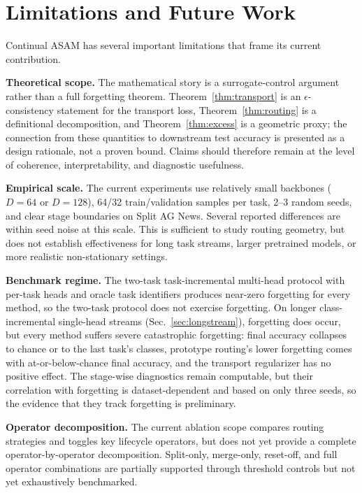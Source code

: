 \documentclass[11pt,a4paper]{article}
\theoremstyle{definition}
\begin{document}
\section{Limitations and Future Work}
\label{sec:limitations}

Continual ASAM has several important limitations that frame its current contribution.

\textbf{Theoretical scope.} The mathematical story is a surrogate-control argument rather than a full forgetting theorem. Theorem~\ref{thm:transport} is an $\epsilon$-consistency statement for the transport loss, Theorem~\ref{thm:routing} is a definitional decomposition, and Theorem~\ref{thm:excess} is a geometric proxy; the connection from these quantities to downstream test accuracy is presented as a design rationale, not a proven bound. Claims should therefore remain at the level of coherence, interpretability, and diagnostic usefulness.

\textbf{Empirical scale.} The current experiments use relatively small backbones ($D=64$ or $D=128$), 64/32 train/validation samples per task, 2--3 random seeds, and clear stage boundaries on Split AG News. Several reported differences are within seed noise at this scale. This is sufficient to study routing geometry, but does not establish effectiveness for long task streams, larger pretrained models, or more realistic non-stationary settings.

\textbf{Benchmark regime.} The two-task task-incremental multi-head protocol with per-task heads and oracle task identifiers produces near-zero forgetting for every method, so the two-task protocol does not exercise forgetting. On longer class-incremental single-head streams (Sec.~\ref{sec:longstream}), forgetting does occur, but every method suffers severe catastrophic forgetting: final accuracy collapses to chance or to the last task's classes, prototype routing's lower forgetting comes with at-or-below-chance final accuracy, and the transport regularizer has no positive effect. The stage-wise diagnostics remain computable, but their correlation with forgetting is dataset-dependent and based on only three seeds, so the evidence that they track forgetting is preliminary.

\textbf{Operator decomposition.} The current ablation scope compares routing strategies and toggles key lifecycle operators, but does not yet provide a complete operator-by-operator decomposition. Split-only, merge-only, reset-off, and full operator combinations are partially supported through threshold controls but not yet exhaustively benchmarked.
\end{document}
